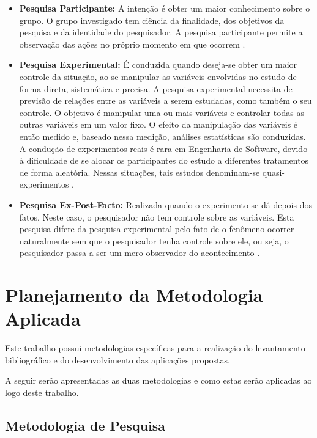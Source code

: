 \begin{itemize}
\begin{itemize}
			\item \textbf{Pesquisa Participante:} A intenção é obter um maior conhecimento sobre o grupo. O grupo investigado tem ciência da finalidade, dos objetivos da pesquisa e da identidade do pesquisador. A pesquisa participante permite a observação das ações no próprio momento em que ocorrem \cite{Silva:Tafner:2007}.
			
			\item \textbf{Pesquisa Experimental:} É conduzida quando deseja-se obter um maior controle da situação, ao se manipular as variáveis envolvidas no estudo de forma direta, sistemática e precisa. A pesquisa experimental necessita de previsão de relações entre as variáveis a serem estudadas, como também o seu controle. O objetivo é manipular uma ou mais variáveis e controlar todas as outras variáveis em um valor fixo. O efeito da manipulação das variáveis é então medido e, baseado nessa medição, análises estatísticas são conduzidas. A condução de experimentos reais é rara em Engenharia de Software, devido à dificuldade de se alocar os participantes do estudo a diferentes tratamentos de forma aleatória. Nessas situações, tais estudos denominam-se quasi-experimentos \cite{Mafra:Travassos:2006}.
			
			\item \textbf{Pesquisa Ex-Post-Facto:} Realizada quando o experimento se dá depois dos fatos. Neste caso, o pesquisador não tem controle sobre as variáveis. Esta pesquisa difere da pesquisa experimental pelo fato de o fenômeno ocorrer naturalmente sem que o pesquisador tenha controle sobre ele, ou seja, o pesquisador passa a ser um mero observador do acontecimento \cite{Silva:Tafner:2007}.
		\end{itemize}

\end{itemize}

\section{Planejamento da Metodologia Aplicada}

Este trabalho possui metodologias específicas para a realização do levantamento bibliográfico e do desenvolvimento das aplicações propostas.

A seguir serão apresentadas as duas metodologias e como estas serão aplicadas ao logo deste trabalho.

\subsection{Metodologia de Pesquisa}

